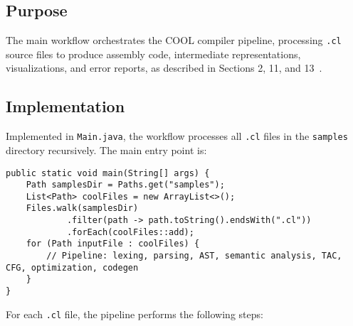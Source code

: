 \documentclass[11pt, titlepage]{article}
\begin{document}
\subsection{Purpose}
The main workflow orchestrates the COOL compiler pipeline, processing \texttt{.cl} source files to produce assembly code, intermediate representations, visualizations, and error reports, as described in Sections 2, 11, and 13~\cite{cool_manual}.

\subsection{Implementation}
Implemented in \texttt{Main.java}, the workflow processes all \texttt{.cl} files in the \texttt{samples} directory recursively. The main entry point is:

\begin{lstlisting}
public static void main(String[] args) {
    Path samplesDir = Paths.get("samples");
    List<Path> coolFiles = new ArrayList<>();
    Files.walk(samplesDir)
            .filter(path -> path.toString().endsWith(".cl"))
            .forEach(coolFiles::add);
    for (Path inputFile : coolFiles) {
        // Pipeline: lexing, parsing, AST, semantic analysis, TAC, CFG, optimization, codegen
    }
}
\end{lstlisting}

For each \texttt{.cl} file, the pipeline performs the following steps:
\end{document}
